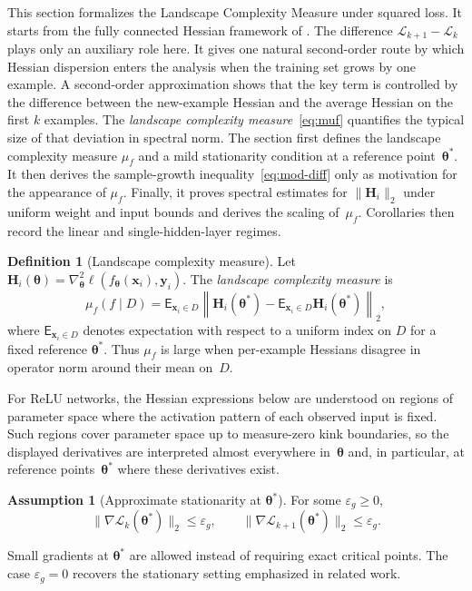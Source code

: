 \documentclass[10pt,letterpaper]{article}
\theoremstyle{definition}
\newtheorem{assumption}{Assumption}
\newtheorem{definition}{Definition}
\begin{document}
This section formalizes the Landscape Complexity Measure under squared loss. It starts from the fully connected Hessian framework of \cite{kiselev2024hessian}.
The difference $\mathcal{L}_{k+1}-\mathcal{L}_k$ plays only an auxiliary role here. It gives one natural second-order route by which Hessian dispersion enters the analysis when the training set grows by one example.
A second-order approximation shows that the key term is controlled by the difference between the new-example Hessian and the average Hessian on the first $k$ examples. The \emph{landscape complexity measure}~\eqref{eq:muf} quantifies the typical size of that deviation in spectral norm.
The section first defines the landscape complexity measure $\mu_f$ and a mild stationarity condition at a reference point~$\boldsymbol{\theta}^*$. It then derives the sample-growth inequality~\eqref{eq:mod-diff} only as motivation for the appearance of $\mu_f$. Finally, it proves spectral estimates for $\|\mathbf{H}_i\|_2$ under uniform weight and input bounds and derives the scaling of~$\mu_f$.
Corollaries then record the linear and single-hidden-layer regimes.

\begin{definition}[Landscape complexity measure]\label{def:muf}
Let $\mathbf{H}_i(\boldsymbol{\theta}) = \nabla^2_{\boldsymbol{\theta}} \ell(f_{\boldsymbol{\theta}}(\mathbf{x}_i),\mathbf{y}_i)$.
The \emph{landscape complexity measure} is
\begin{equation}\label{eq:muf}
  \mu_f(f\mid D)
  = \mathsf{E}_{\mathbf{x}_i\in D}\left\|
      \mathbf{H}_{i}(\boldsymbol{\theta}^*)
      - \mathsf{E}_{\mathbf{x}_i\in D}\mathbf{H}_{i}(\boldsymbol{\theta}^*)
    \right\|_2 ,
\end{equation}
where $\mathsf{E}_{\mathbf{x}_i\in D}$ denotes expectation with respect to a uniform index on $D$ for a fixed reference $\boldsymbol{\theta}^*$.
Thus $\mu_f$ is large when per-example Hessians disagree in operator norm around their mean on~$D$.
\end{definition}
\noindent
For ReLU networks, the Hessian expressions below are understood on regions of parameter space where the activation pattern of each observed input is fixed. Such regions cover parameter space up to measure-zero kink boundaries, so the displayed derivatives are interpreted almost everywhere in~$\boldsymbol{\theta}$ and, in particular, at reference points~$\boldsymbol{\theta}^*$ where these derivatives exist.

\begin{assumption}[Approximate stationarity at $\boldsymbol{\theta}^*$]\label{ass:local-min}
For some $\varepsilon_g\ge 0$,
\begin{equation}\label{eq:eps-g}
  \bigl\|\nabla \mathcal{L}_k(\boldsymbol{\theta}^*)\bigr\|_2 \le \varepsilon_g,
  \qquad
  \bigl\|\nabla \mathcal{L}_{k+1}(\boldsymbol{\theta}^*)\bigr\|_2 \le \varepsilon_g .
\end{equation}
\end{assumption}
\noindent
Small gradients at $\boldsymbol{\theta}^*$ are allowed instead of requiring exact critical points. The case $\varepsilon_g=0$ recovers the stationary setting emphasized in related work.
\end{document}
